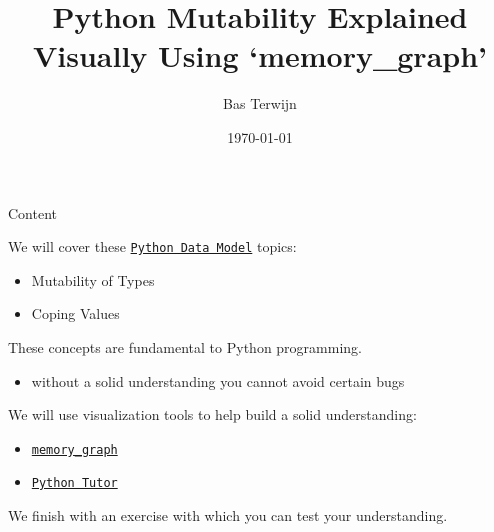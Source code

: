 \documentclass[10pt, colorlinks=true, urlcolor=blue]{beamer}
\title{Python Mutability Explained Visually Using `memory\_graph'}
\author{Bas Terwijn}
\date{\today}
\begin{document}
\begin{frame}
    \titlepage
\end{frame}

\begin{frame}{Content}

  We will cover these \href{https://docs.python.org/3/reference/datamodel.html}{\texttt{Python Data Model}} topics:
  \begin{itemize}
  \item Mutability of Types
  \item Coping Values
  \end{itemize}

  \vspace{2em}
  
  These concepts are fundamental to Python programming.
  \begin{itemize}
    \item without a solid understanding you cannot avoid certain bugs
  \end{itemize}

  \vspace{2em}
  
  We will use visualization tools to help build a solid understanding:
  \begin{itemize}
  \item \href{https://pypi.org/project/memory-graph/}{\texttt{memory\_graph}}
  \item \href{https://pythontutor.com/}{\texttt{Python Tutor}}
  \end{itemize}

  \vspace{2em}

  We finish with an exercise with which you can test your understanding.
\end{frame}
\end{document}
